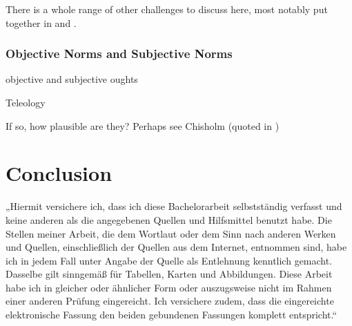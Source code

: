 \documentclass[12pt,numbers=noenddot]{scrartcl}
\begin{document}
There is a whole range of other challenges to discuss here, most notably put together in \textcite{Greenberg2016-GREITN} and \textcite{Mchugh2012-MCHTTN}.



\subsubsection{Objective Norms and Subjective Norms}


objective and subjective oughts
\textcite{Gibbard2005-GIBTAC} 
\textcite{Wedgwood2016-WEDOAS}
\textcite[Ch. 2]{Gibbons2013-GIBTNO}

Teleology
\textcite[Ch. 5]{Gibbons2013-GIBTNO}

If so, how plausible are they? Perhaps see Chisholm (quoted in \textcite{Goldman2002-GOLTUO-2})

\section{Conclusion}

\printbibliography

\clearpage
\begin{center}
    „Hiermit versichere ich, dass ich diese Bachelorarbeit selbstständig verfasst und keine anderen als die angegebenen Quellen und Hilfsmittel benutzt habe. Die Stellen meiner Arbeit, die dem Wortlaut oder dem Sinn nach anderen Werken und Quellen, einschließlich der Quellen aus dem Internet, entnommen sind, habe ich in jedem Fall unter Angabe der Quelle als Entlehnung kenntlich gemacht. Dasselbe gilt sinngemäß für Tabellen, Karten und Abbildungen. Diese Arbeit habe ich in gleicher oder ähnlicher Form oder auszugsweise nicht im Rahmen einer anderen Prüfung eingereicht. Ich versichere zudem, dass die eingereichte elektronische Fassung den beiden gebundenen Fassungen komplett entspricht.“
\end{center}
\end{document}
